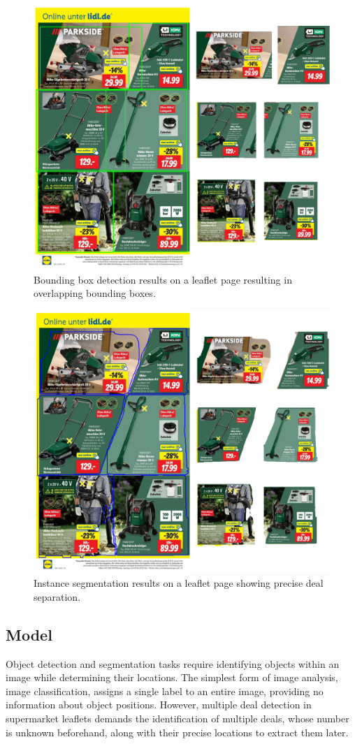 \documentclass[11pt]{article}
\begin{document}
\begin{figure}[h!]
    \centering
    \includegraphics[width=0.6\linewidth]{figures/deal_detection/bbox_page.png}
    \caption{Bounding box detection results on a leaflet page resulting in overlapping bounding boxes.}
    \label{fig:ddetect_bbox_page}
\end{figure}

\begin{figure}[h!]
    \centering
    \includegraphics[width=0.6\linewidth]{figures/deal_detection/mask_page.png}
    \caption{Instance segmentation results on a leaflet page showing precise deal separation.}
    \label{fig:ddetect_mask_page}
\end{figure}

\subsection{Model}
Object detection and segmentation tasks require identifying objects within an image while determining their locations. The simplest form of image analysis, image classification, assigns a single label to an entire image, providing no information about object positions. However, multiple deal detection in supermarket leaflets demands the identification of multiple deals, whose number is unknown beforehand, along with their precise locations to extract them later.
\end{document}
